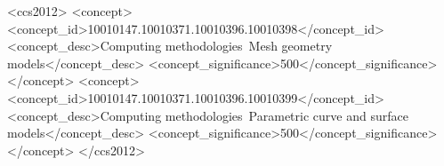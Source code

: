 \documentclass[acmtog,anonymous,review]{acmart}
\begin{document}
\begin{CCSXML}
<ccs2012>
   <concept>
       <concept_id>10010147.10010371.10010396.10010398</concept_id>
       <concept_desc>Computing methodologies~Mesh geometry models</concept_desc>
       <concept_significance>500</concept_significance>
       </concept>
   <concept>
       <concept_id>10010147.10010371.10010396.10010399</concept_id>
       <concept_desc>Computing methodologies~Parametric curve and surface models</concept_desc>
       <concept_significance>500</concept_significance>
       </concept>
 </ccs2012>
\end{CCSXML}


\end{document}
